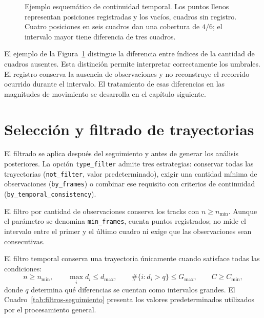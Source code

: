 \begin{figure}[htbp]
  \centering
  \caption{Ejemplo esquemático de continuidad temporal. Los puntos llenos representan posiciones registradas y los vacíos, cuadros sin registro. Cuatro posiciones en seis cuadros dan una cobertura de $4/6$; el intervalo mayor tiene diferencia de tres cuadros.}
  \label{fig:gap-seguimiento}
\end{figure}

El ejemplo de la Figura~\ref{fig:gap-seguimiento} distingue la diferencia entre índices de la cantidad de cuadros ausentes. Esta distinción permite interpretar correctamente los umbrales. El registro conserva la ausencia de observaciones y no reconstruye el recorrido ocurrido durante el intervalo. El tratamiento de esas diferencias en las magnitudes de movimiento se desarrolla en el capítulo siguiente.

\section{Selección y filtrado de trayectorias}

El filtrado se aplica después del seguimiento y antes de generar los análisis posteriores. La opción \texttt{type\_filter} admite tres estrategias: conservar todas las trayectorias (\texttt{not\_filter}, valor predeterminado), exigir una cantidad mínima de observaciones (\texttt{by\_frames}) o combinar ese requisito con criterios de continuidad (\texttt{by\_temporal\_consistency}).

El filtro por cantidad de observaciones conserva los tracks con $n\geq n_{\min}$. Aunque el parámetro se denomina \texttt{min\_frames}, cuenta puntos registrados; no mide el intervalo entre el primer y el último cuadro ni exige que las observaciones sean consecutivas.

El filtro temporal conserva una trayectoria únicamente cuando satisface todas las condiciones:
\begin{equation}
  n\geq n_{\min},\qquad
  \max_i d_i\leq d_{\max},\qquad
  \#\{i:d_i>q\}\leq G_{\max},\qquad
  C\geq C_{\min},
\end{equation}
donde $q$ determina qué diferencias se cuentan como intervalos grandes. El Cuadro~\ref{tab:filtros-seguimiento} presenta los valores predeterminados utilizados por el procesamiento general.


